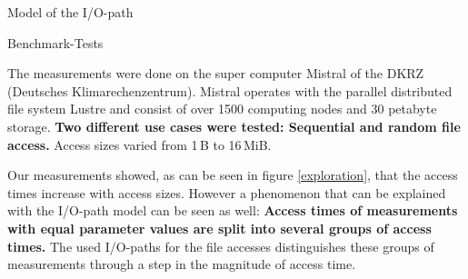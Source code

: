\documentclass[final]{beamer}
\newlength{\onecolwid}
\begin{document}
\begin{frame}[t]
\begin{columns}[t]
\begin{column}{\onecolwid}
\begin{block}{Model of the I/O-path}


	
	
\end{block}

\begin{block}{Benchmark-Tests}
	
	The measurements were done on the super computer Mistral of the DKRZ (Deutsches Klimarechenzentrum).
	Mistral operates with the parallel distributed file system Lustre and consist of over 1500 computing nodes and 30 petabyte storage.
	\textbf{Two different use cases were tested: Sequential and random file access.}
	Access sizes varied from 1\,B to 16\,MiB.\medskip
	
		Our measurements showed, as can be seen in figure \ref{exploration}, that the access times increase with access sizes.
		However a phenomenon that can be explained with the I/O-path model can be seen as well: \textbf{Access times of measurements with equal parameter values are split into several groups of access times.}
		The used I/O-paths for the file accesses distinguishes these groups of measurements through a step in the magnitude of access time.
		

\end{block}
\end{column}
\end{columns}
\end{frame}
\end{document}
